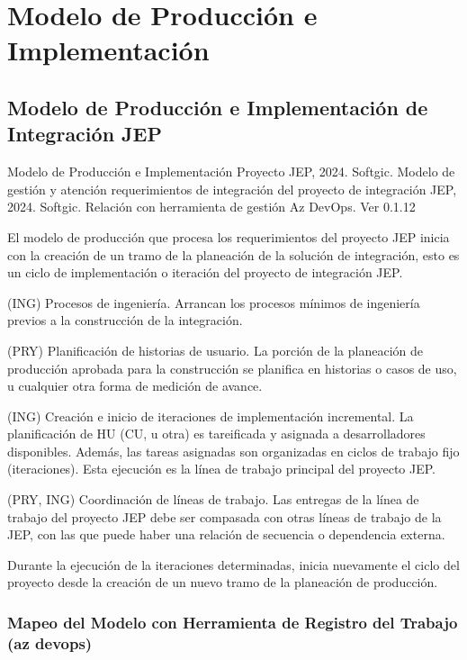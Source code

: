 \documentclass[
  paper=a4,
  ,captions=tableheading
]{scrartcl}
\renewenvironment{quote}{\begin{customblockquote}\list{}{\rightmargin=0em\leftmargin=0em}%
\item\relax\color{blockquote-text}\ignorespaces}{\unskip\unskip\endlist\end{customblockquote}}
\begin{document}
\newpage

\section{Modelo de Producción e
Implementación}\label{sec:modelo-de-producciuxf3n-e-implementaciuxf3n}

\subsection{Modelo de Producción e Implementación de Integración
JEP}\label{sec:modelo-de-producciuxf3n-e-implementaciuxf3n-de-integraciuxf3n-jep}

\begin{quote}
Modelo de Producción e Implementación Proyecto JEP, 2024. Softgic.
Modelo de gestión y atención requerimientos de integración del proyecto
de integración JEP, 2024. Softgic. Relación con herramienta de gestión
Az DevOps. Ver 0.1.12
\end{quote}

El modelo de producción que procesa los requerimientos del proyecto JEP
inicia con la creación de un tramo de la planeación de la solución de
integración, esto es un ciclo de implementación o iteración del proyecto
de integración JEP.

(ING) Procesos de ingeniería. Arrancan los procesos mínimos de
ingeniería previos a la construcción de la integración.

(PRY) Planificación de historias de usuario. La porción de la planeación
de producción aprobada para la construcción se planifica en historias o
casos de uso, u cualquier otra forma de medición de avance.

(ING) Creación e inicio de iteraciones de implementación incremental. La
planificación de HU (CU, u otra) es tareificada y asignada a
desarrolladores disponibles. Además, las tareas asignadas son
organizadas en ciclos de trabajo fijo (iteraciones). Esta ejecución es
la línea de trabajo principal del proyecto JEP.

(PRY, ING) Coordinación de líneas de trabajo. Las entregas de la línea
de trabajo del proyecto JEP debe ser compasada con otras líneas de
trabajo de la JEP, con las que puede haber una relación de secuencia o
dependencia externa.

Durante la ejecución de la iteraciones determinadas, inicia nuevamente
el ciclo del proyecto desde la creación de un nuevo tramo de la
planeación de producción.

\subsubsection{Mapeo del Modelo con Herramienta de Registro del Trabajo
(az
devops)}\label{sec:mapeo-del-modelo-con-herramienta-de-registro-del-trabajo-az-devops}
\end{document}
